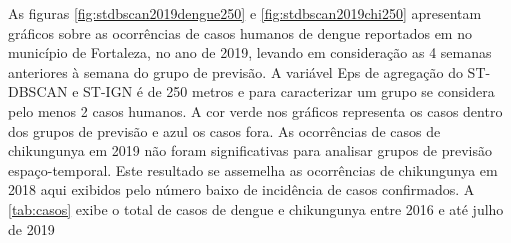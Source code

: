 As figuras \ref{fig:stdbscan2019dengue250} e \ref{fig:stdbscan2019chi250} apresentam gráficos sobre as ocorrências de casos humanos de dengue reportados em \cite{simda} no município de Fortaleza, no ano de 2019, levando em consideração as 4 semanas anteriores à semana do grupo de previsão. A variável Eps de agregação do \acrshort{ST-DBSCAN} e ST-IGN é de 250 metros e para caracterizar um grupo se considera pelo menos 2 casos humanos. A cor verde nos gráficos representa os casos dentro dos grupos de previsão e azul os casos fora. As ocorrências de casos de chikungunya em 2019 não foram significativas para analisar grupos de previsão espaço-temporal. Este resultado se assemelha as ocorrências de chikungunya em 2018 aqui exibidos pelo número baixo de incidência de casos confirmados. A \ref{tab:casos} exibe o total de casos de dengue e chikungunya entre 2016 e até julho de 2019

\begin{table}[ht!]	
	\centering
\end{table}

\begin{figure}[!ht]
	\centering	
\end{figure}
\FloatBarrier

\begin{figure}[!ht]
	\centering	
\end{figure}
\FloatBarrier

